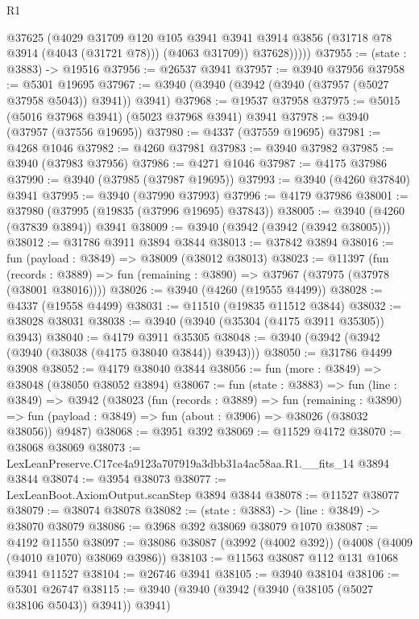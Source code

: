 \begin{lexlean}{R1}
\begin{coremodule}
              @37625
              (@4029
                @31709
                @120
                @105
                @3941
                @3941
                @3914
                @3856
                (@31718 @78 @3914 (@4043 (@31721 @78)))
                (@4063 @31709))
              @37628)))))
@37955 := (state : @3883) -> @19516
@37956 := @26537 @3941
@37957 := @3940 @37956
@37958 := @5301 @19695
@37967 := @3940 (@3940 (@3942 (@3940 (@37957 (@5027 @37958 @5043)) @3941)) @3941)
@37968 := @19537 @37958
@37975 := @5015 (@5016 @37968 @3941) (@5023 @37968 @3941) @3941
@37978 := @3940 (@37957 (@37556 @19695))
@37980 := @4337 (@37559 @19695)
@37981 := @4268 @1046
@37982 := @4260 @37981
@37983 := @3940 @37982
@37985 := @3940 (@37983 @37956)
@37986 := @4271 @1046
@37987 := @4175 @37986
@37990 := @3940 (@37985 (@37987 @19695))
@37993 := @3940 (@4260 @37840) @3941
@37995 := @3940 (@37990 @37993)
@37996 := @4179 @37986
@38001 := @37980 (@37995 (@19835 (@37996 @19695) @37843))
@38005 := @3940 (@4260 (@37839 @3894)) @3941
@38009 := @3940 (@3942 (@3942 (@3942 @38005)))
@38012 := @31786 @3911 @3894 @3844
@38013 := @37842 @3894
@38016 := fun (payload : @3849) => @38009 (@38012 @38013)
@38023 := @11397
    (fun (records : @3889) => fun (remaining : @3890) => @37967 (@37975 (@37978 (@38001 @38016))))
@38026 := @3940 (@4260 (@19555 @4499))
@38028 := @4337 (@19558 @4499)
@38031 := @11510 (@19835 @11512 @3844)
@38032 := @38028 @38031
@38038 := @3940 (@3940 (@35304 (@4175 @3911 @35305)) @3943)
@38040 := @4179 @3911 @35305
@38048 := @3940 (@3942 (@3942 (@3940 (@38038 (@4175 @38040 @3844)) @3943)))
@38050 := @31786 @4499 @3908
@38052 := @4179 @38040 @3844
@38056 := fun (more : @3849) => @38048 (@38050 @38052 @3894)
@38067 := fun (state : @3883) =>
  fun (line : @3849) =>
  @3942
    (@38023
      (fun (records : @3889) =>
      fun (remaining : @3890) =>
      fun (payload : @3849) => fun (about : @3906) => @38026 (@38032 @38056))
      @9487)
@38068 := @3951 @392
@38069 := @11529 @4172
@38070 := @38068 @38069
@38073 := LexLeanPreserve.C17ce4a9123a707919a3dbb31a4ac58aa.R1.__fits_14 @3894 @3844
@38074 := @3954 @38073
@38077 := LexLeanBoot.AxiomOutput.scanStep @3894 @3844
@38078 := @11527 @38077
@38079 := @38074 @38078
@38082 := (state : @3883) -> (line : @3849) -> @38070 @38079
@38086 := @3968 @392 @38069 @38079 @1070
@38087 := @4192 @11550
@38097 := @38086 @38087 (@3992 (@4002 @392)) (@4008 (@4009 (@4010 @1070) @38069 @3986))
@38103 := @11563 @38087 @112 @131 @1068 @3941 @11527
@38104 := @26746 @3941
@38105 := @3940 @38104
@38106 := @5301 @26747
@38115 := @3940 (@3940 (@3942 (@3940 (@38105 (@5027 @38106 @5043)) @3941)) @3941)

\end{coremodule}
\end{lexlean}
